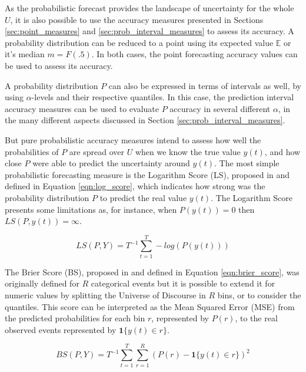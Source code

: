 As the probabilistic forecast provides the landscape of uncertainty for the whole $U$, it is also possible to use the accuracy measures presented in Sections \ref{sec:point_measures} and \ref{sec:prob_interval_measures} to assess its accuracy. A probability distribution can be reduced to a point using its expected value $\mathbb{E}$ or it's median $m = F(.5)$. In both cases, the point forecasting accuracy values can be used to assess its accuracy.

A probability distribution $P$ can also be expressed in terms of intervals as well, by using $\alpha$-levels and their respective quantiles. In this case, the prediction interval accuracy measures can be used to evaluate $P$ accuracy in several different $\alpha$, in the many different aspects discussed in Section \ref{sec:prob_interval_measures}.

But pure probabilistic accuracy measures intend to assess how well the probabilities of $P$ are spread over $U$ when we know the true value $y(t)$, and how close $P$ were able to predict the uncertainty around $y(t)$. The most simple probabilistic forecasting measure is the Logarithm Score (LS), proposed in \cite{Good1952} and defined in Equation \eqref{eqn:log_score}, which indicates how strong was the probability distribution $P$ to predict the real value $y(t)$. The Logarithm Score presents some limitations as, for instance, when $P(y(t)) = 0$ then $LS(P,y(t)) = \infty$.

\begin{equation}
    LS(P,Y) = T^{-1} \sum_{t=1}^T -log(P(y(t)))
    \label{eqn:log_score}
\end{equation}


The Brier Score (BS), proposed in \cite{Brier1950} and defined in Equation \eqref{eqn:brier_score}, was originally defined for $R$ categorical events but it is possible to extend it for numeric values by splitting the Universe of Discourse in $R$ bins, or to consider the quantiles. This score can be interpreted as the Mean Squared Error (MSE) from the predicted probabilities for each bin $r$, represented by $P(r)$, to the real observed events represented by $\mathbf{1}\{ y(t) \in r\}$.

\begin{equation}
    BS(P,Y) = T^{-1} \sum_{t=1}^T \sum_{r=1}^R ( P(r) - \mathbf{1}\{ y(t) \in r\})^2
    \label{eqn:brier_score}
\end{equation}


